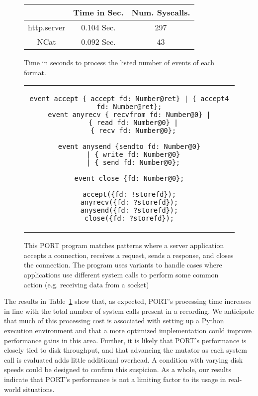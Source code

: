 \begin{figure}
  \begin{tabular}{|c|c|c}
                & Time in Sec. & Num. Syscalls.\\
              \hline
  http.server   & 0.104 Sec.   & 297   \\
  NCat          & 0.092 Sec.   & 43      \\
\end{tabular}
\caption{Time in seconds to process the listed number of events of each format.}
\label{tbl:RealWorldPerformance}
\end{figure}

\begin{figure}[H]
\centering
\begin{tabular}{c}
\begin{lstlisting}
event accept { accept fd: Number@ret} | { accept4 fd: Number@ret};
event anyrecv { recvfrom fd: Number@0} |
  { read fd: Number@0} |
  { recv fd: Number@0};

event anysend {sendto fd: Number@0}
  | { write fd: Number@0}
  | { send fd: Number@0};

event close {fd: Number@0};

accept({fd: !storefd});
anyrecv({fd: ?storefd});
anysend({fd: ?storefd});
close({fd: ?storefd});
\end{lstlisting}
\end{tabular}
\caption{This PORT program matches patterns where a server application
  accepts a connection, receives a request, sends a response, and closes
  the connection.  The program uses variants to handle cases where
  applications use different system calls to perform some common action
  (e.g. receiving data from a socket)}
\label{lst:RealWorldPerformance}
\end{figure}

The results in Table~\ref{tbl:RealWorldPerformance} show that, as expected,
PORT's
processing time increases in line with the total number of system calls
present in a recording.  We anticipate that much of this processing cost is
associated with setting up a Python execution environment and that a more
optimized implementation could improve performance gains in this area.
Further,
it is likely that PORT's performance is closely tied to
disk throughput,
and that advancing the mutator
as each system call is evaluated
adds little additional overhead.
A condition with varying disk
speeds could be designed to confirm this suspicion.  As a whole, our
results indicate that PORT's performance is not a limiting factor to its
usage in real-world situations.
